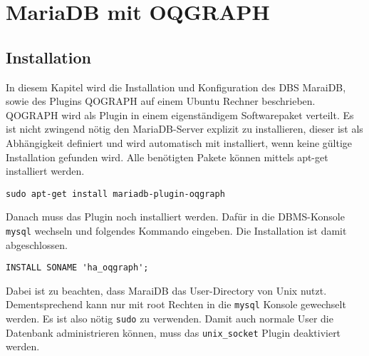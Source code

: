 \section{MariaDB mit OQGRAPH} %
\subsection{Installation}\label{Installation}
In diesem Kapitel wird die Installation und Konfiguration des DBS MaraiDB, sowie des Plugins QOGRAPH auf einem Ubuntu Rechner beschrieben.  
QOGRAPH wird als Plugin in einem eigenständigem Softwarepaket verteilt. Es ist nicht zwingend nötig den MariaDB-Server explizit zu installieren, dieser ist als Abhängigkeit definiert und wird automatisch mit installiert, wenn keine gültige Installation gefunden wird. Alle benötigten Pakete können mittels apt-get installiert werden.
\begin{lstlisting}
sudo apt-get install mariadb-plugin-oqgraph
\end{lstlisting}
Danach muss das Plugin noch installiert werden. Dafür in die DBMS-Konsole \texttt{mysql} wechseln und folgendes Kommando eingeben. Die Installation ist damit abgeschlossen.
\begin{lstlisting}
INSTALL SONAME 'ha_oqgraph';
\end{lstlisting}

Dabei ist zu beachten, dass MaraiDB das User-Directory von Unix nutzt. Dementsprechend kann nur mit root Rechten in die \texttt{mysql} Konsole  gewechselt werden. Es ist also nötig \texttt{sudo} zu verwenden. Damit auch normale User die Datenbank administrieren können, muss das \texttt{unix\_socket} Plugin deaktiviert werden.


